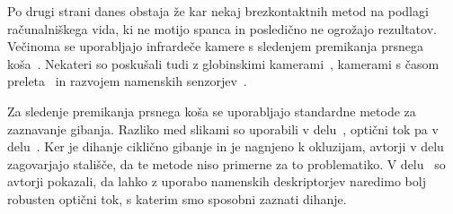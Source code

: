Po drugi strani danes obstaja že kar nekaj brezkontaktnih metod na podlagi računalniškega vida, ki ne motijo spanca in posledično ne ogrožajo rezultatov. Večinoma se uporabljajo infrardeče kamere s sledenjem premikanja prsnega koša~\cite{sathyanarayana2015vision}. Nekateri so poskušali tudi z globinskimi kamerami~\cite{yang2014sleep}, kamerami s časom preleta~\cite{falie2009statistical} in razvojem namenskih senzorjev~\cite{takemura2005respiratory}.

Za sledenje premikanja prsnega koša se uporabljajo standardne metode za zaznavanje gibanja. Razliko med slikami so uporabili v delu~\cite{nakai2000non}, optični tok pa v delu~\cite{nakajima2001development}. Ker je dihanje ciklično gibanje in je nagnjeno k okluzijam, avtorji v delu~\cite{wang2014unconstrained} zagovarjajo stališče, da te metode niso primerne za to problematiko. V delu~\cite{koporec2017observation} so avtorji pokazali, da lahko z uporabo namenskih deskriptorjev naredimo bolj robusten optični tok, s katerim smo sposobni zaznati dihanje.